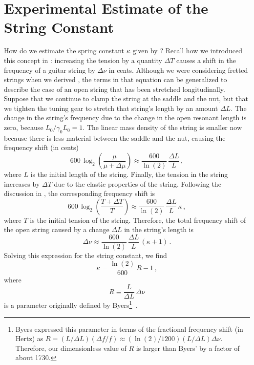 %
%
%

 \section{Experimental Estimate of the String Constant\label{sct:exp}}

 How do we estimate the spring constant $\kappa$ given by ? Recall how we introduced this concept in : increasing the tension by a quantity $\Delta T$ causes a shift in the frequency of a guitar string by $\Delta \nu$ in cents. Although we were considering fretted strings when we derived , the terms in that equation can be generalized to describe the case of an open string that has been stretched longitudinally. Suppose that we continue to clamp the string at the saddle and the nut, but that we tighten the tuning gear to stretch that string's length by an amount $\Delta L$. The change in the string's frequency due to the change in the open resonant length is zero, because $L_0 / \gamma_0 L_0 = 1$. The linear mass density of the string is smaller now because there is less material between the saddle and the nut, causing the frequency shift (in cents)
 \begin{equation}
600\, \log_2 \left(  \frac{\mu}{\mu + \Delta \mu} \right) \approx \frac{600}{\ln(2)}\, \frac{\Delta L}{L}\, ,
 \end{equation}
where $L$ is the initial length of the string. Finally, the tension in the string increases by $\Delta T$ due to the elastic properties of the string. Following the discussion in , the corresponding frequency shift  is
 \begin{equation}
600\, \log_2 \left(  \frac{T + \Delta T}{T} \right) \approx \frac{600}{\ln(2)}\, \frac{\Delta L}{L}\, \kappa\, ,
 \end{equation}
where $T$ is the initial tension of the string. Therefore, the total frequency shift of the open string caused by a change $\Delta L$ in the string's length is
 \begin{equation}
\Delta \nu \approx \frac{600}{\ln(2)}\, \frac{\Delta L}{L}\, (\kappa + 1)\, .
 \end{equation}
Solving this expression for the string constant, we find
 \begin{equation}
\kappa = \frac{\ln(2)}{600}\, R - 1\, ,
 \end{equation}
where
 \begin{equation}
R \equiv \frac{L}{\Delta L}\, \Delta \nu
 \end{equation}
is a parameter originally defined by Byers\footnote{Byers expressed this parameter in terms of the fractional frequency shift (in Hertz) as $R = (L/\Delta L) (\Delta f/f) \approx (\ln(2)/1200) (L/\Delta L) \Delta \nu$. Therefore, our dimensionless value of $R$ is larger than Byers' by a factor of about 1730.}~\cite{ref:byers1996cgi,ref:varieschi2010icf}.

